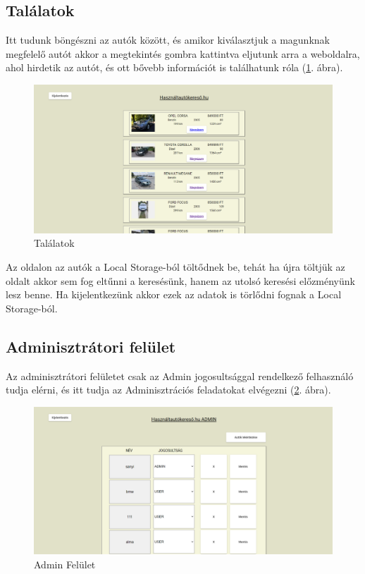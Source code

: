 \subsection{Találatok}

Itt tudunk böngészni az autók között, és amikor kiválasztjuk a magunknak megfelelő autót akkor a megtekintés gombra kattintva eljutunk arra a weboldalra, ahol hirdetik az autót, és ott bővebb információt is találhatunk róla (\ref{fig:Találatok}. ábra).

\begin{figure}[h]
\centering
\includegraphics[scale=0.9]{images/Talalatok_FE.png}
\caption{Találatok}
\label{fig:Találatok}
\end{figure}

Az oldalon az autók a Local Storage-ból töltődnek be, tehát ha újra töltjük az oldalt akkor sem fog eltűnni a keresésünk, hanem az utolsó keresési előzményünk lesz benne. Ha kijelentkezünk akkor ezek az adatok is törlődni fognak a Local Storage-ból.
\newpage

\subsection{Adminisztrátori felület}

Az adminisztrátori felületet csak az Admin jogosultsággal rendelkező felhasználó tudja elérni, és itt tudja az Adminisztrációs feladatokat elvégezni (\ref{fig:Admin}. ábra).

\begin{figure}[h]
\centering
\includegraphics[scale=0.9]{images/Admin_FE.png}
\caption{Admin Felület}
\label{fig:Admin}
\end{figure}

